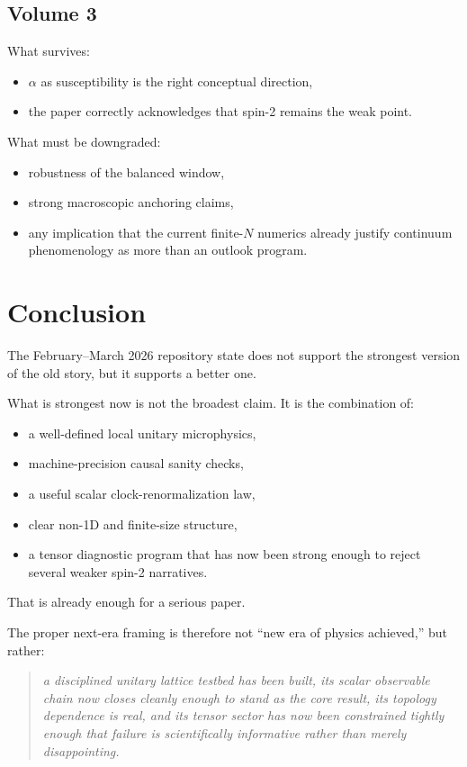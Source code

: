 \documentclass[11pt]{article}
\begin{document}
\subsection*{Volume 3}

What survives:
\begin{itemize}
    \item $\alpha$ as susceptibility is the right conceptual direction,
    \item the paper correctly acknowledges that spin-2 remains the weak point.
\end{itemize}

What must be downgraded:
\begin{itemize}
    \item robustness of the balanced window,
    \item strong macroscopic anchoring claims,
    \item any implication that the current finite-$N$ numerics already justify continuum phenomenology as more than an outlook program.
\end{itemize}

\section{Conclusion}

The February--March 2026 repository state does not support the strongest version of the old story, but it supports a better one.

What is strongest now is not the broadest claim. It is the combination of:
\begin{itemize}
    \item a well-defined local unitary microphysics,
    \item machine-precision causal sanity checks,
    \item a useful scalar clock-renormalization law,
    \item clear non-1D and finite-size structure,
    \item a tensor diagnostic program that has now been strong enough to reject several weaker spin-2 narratives.
\end{itemize}

That is already enough for a serious paper.

The proper next-era framing is therefore not ``new era of physics achieved,'' but rather:
\begin{quote}
\emph{a disciplined unitary lattice testbed has been built, its scalar observable chain now closes cleanly enough to stand as the core result, its topology dependence is real, and its tensor sector has now been constrained tightly enough that failure is scientifically informative rather than merely disappointing.}
\end{quote}
\end{document}
